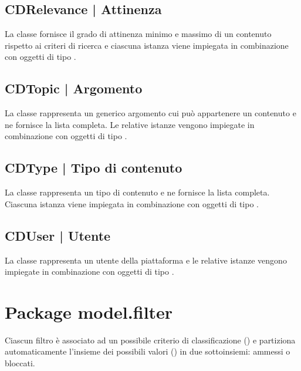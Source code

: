 \documentclass[10pt,a4paper,headinclude,footinclude,hidelinks]{scrreprt} %
\begin{document}
	\subsection[CDRelevance]{CDRelevance | Attinenza}
	\label{sec:stage:design:model.criteria:relevance}
	La classe fornisce il grado di attinenza minimo e massimo di un contenuto rispetto ai criteri di ricerca e ciascuna istanza viene impiegata in combinazione con oggetti di tipo \textit{}.

	\subsection[CDTopic]{CDTopic | Argomento}
	\label{sec:stage:design:model.criteria:topic}
	La classe rappresenta un generico argomento cui può appartenere un contenuto e ne fornisce la lista completa. Le relative istanze vengono impiegate in combinazione con oggetti di tipo \textit{}.

	\subsection[CDType]{CDType | Tipo di contenuto}
	\label{sec:stage:design:model.criteria:type}
	La classe rappresenta un tipo di contenuto e ne fornisce la lista completa. Ciascuna istanza viene impiegata in combinazione con oggetti di tipo \textit{}.

	\subsection[CDUser]{CDUser | Utente}
	\label{sec:stage:design:model.criteria:user}
	La classe rappresenta un utente della piattaforma e le relative istanze vengono impiegate in combinazione con oggetti di tipo \textit{}.

	\section{Package model.filter}
	\label{sec:stage:design:model.filter}
	Ciascun filtro è associato ad un possibile criterio di classificazione (\textit{}) e partiziona automaticamente l'insieme dei possibili valori (\textit{}) in due sottoinsiemi: ammessi o bloccati.
\end{document}
